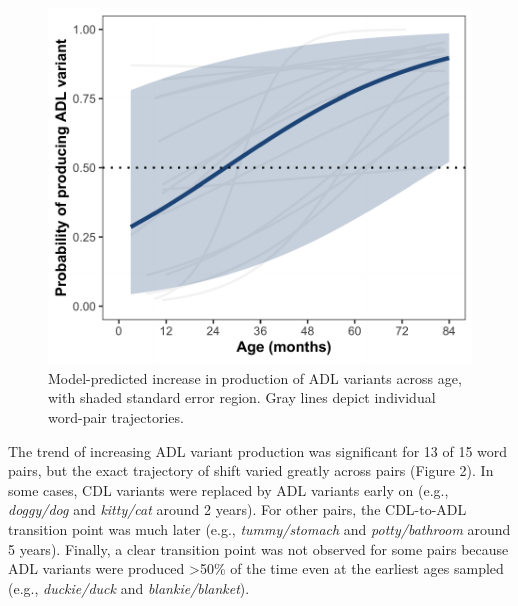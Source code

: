 \documentclass[10pt, letterpaper]{article}
\newenvironment{CodeChunk}{}{}
\begin{document}
\begin{CodeChunk}
\begin{figure}[h]

{\centering \includegraphics{figs/shift-timing-fig-1} 

}

\caption[Model-predicted increase in production of ADL variants across age, with shaded standard error region]{Model-predicted increase in production of ADL variants across age, with shaded standard error region. Gray lines depict individual word-pair trajectories.}\label{fig:shift-timing-fig}
\end{figure}
\end{CodeChunk}

The trend of increasing ADL variant production was significant for 13 of
15 word pairs, but the exact trajectory of shift varied greatly across
pairs (Figure 2). In some cases, CDL variants were replaced by ADL
variants early on (e.g., \emph{doggy/dog} and \emph{kitty/cat} around 2
years). For other pairs, the CDL-to-ADL transition point was much later
(e.g., \emph{tummy/stomach} and \emph{potty/bathroom} around 5 years).
Finally, a clear transition point was not observed for some pairs
because ADL variants were produced \textgreater50\% of the time even at
the earliest ages sampled (e.g., \emph{duckie/duck} and
\emph{blankie/blanket}).
\end{document}
